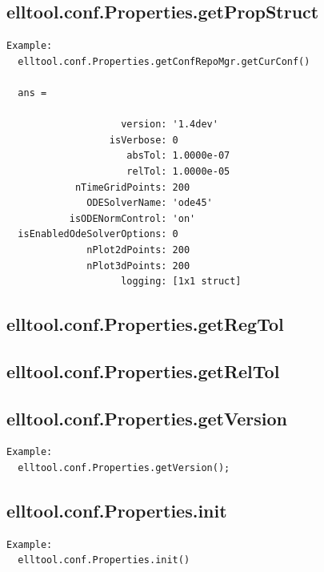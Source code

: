 \documentclass[letterpaper,10pt,english]{sphinxmanual}
\begin{document}
\subsection{elltool.conf.Properties.getPropStruct}
\label{chap_functions:elltool-conf-properties-getpropstruct}
\begin{Verbatim}[commandchars=\\\{\}]
Example:
  elltool.conf.Properties.getConfRepoMgr.getCurConf()

  ans =

                    version: '1.4dev'
                  isVerbose: 0
                     absTol: 1.0000e-07
                     relTol: 1.0000e-05
            nTimeGridPoints: 200
              ODESolverName: 'ode45'
           isODENormControl: 'on'
  isEnabledOdeSolverOptions: 0
              nPlot2dPoints: 200
              nPlot3dPoints: 200
                    logging: [1x1 struct]
\end{Verbatim}


\subsection{elltool.conf.Properties.getRegTol}
\label{chap_functions:elltool-conf-properties-getregtol}

\subsection{elltool.conf.Properties.getRelTol}
\label{chap_functions:elltool-conf-properties-getreltol}

\subsection{elltool.conf.Properties.getVersion}
\label{chap_functions:elltool-conf-properties-getversion}
\begin{Verbatim}[commandchars=\\\{\}]
Example:
  elltool.conf.Properties.getVersion();
\end{Verbatim}


\subsection{elltool.conf.Properties.init}
\label{chap_functions:elltool-conf-properties-init}
\begin{Verbatim}[commandchars=\\\{\}]
Example:
  elltool.conf.Properties.init()
\end{Verbatim}
\end{document}

